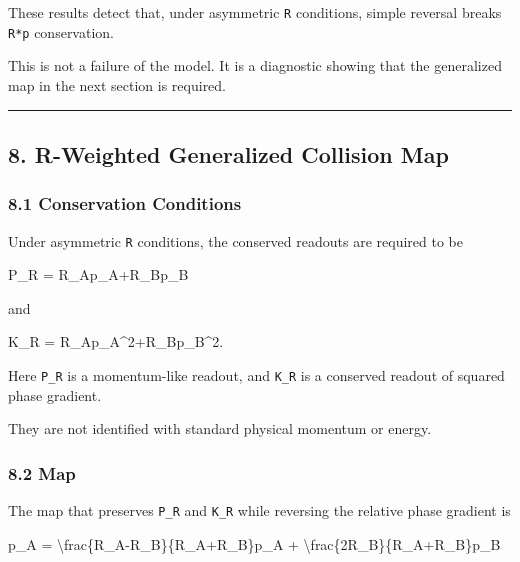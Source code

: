 \documentclass[
  a4paper,
]{article}
\newenvironment{Shaded}{}{}
\newcommand{\NormalTok}[1]{#1}
\begin{document}
These results detect that, under asymmetric \texttt{R} conditions,
simple reversal breaks \texttt{R*p} conservation.

This is not a failure of the model. It is a diagnostic showing that the
generalized map in the next section is required.

\begin{center}\rule{0.5\linewidth}{0.5pt}\end{center}

\subsection{8. R-Weighted Generalized Collision
Map}\label{r-weighted-generalized-collision-map}

\subsubsection{8.1 Conservation
Conditions}\label{conservation-conditions}

Under asymmetric \texttt{R} conditions, the conserved readouts are
required to be

\begin{Shaded}
\begin{Highlighting}[]
\NormalTok{P\_R}
\NormalTok{=}
\NormalTok{R\_Ap\_A+R\_Bp\_B}
\end{Highlighting}
\end{Shaded}

and

\begin{Shaded}
\begin{Highlighting}[]
\NormalTok{K\_R}
\NormalTok{=}
\NormalTok{R\_Ap\_A\^{}2+R\_Bp\_B\^{}2.}
\end{Highlighting}
\end{Shaded}

Here \texttt{P\_R} is a momentum-like readout, and \texttt{K\_R} is a
conserved readout of squared phase gradient.

They are not identified with standard physical momentum or energy.

\subsubsection{8.2 Map}\label{map}

The map that preserves \texttt{P\_R} and \texttt{K\_R} while reversing
the relative phase gradient is

\begin{Shaded}
\begin{Highlighting}[]
\NormalTok{p\_A\textquotesingle{}}
\NormalTok{=}
\NormalTok{\textbackslash{}frac\{R\_A{-}R\_B\}\{R\_A+R\_B\}p\_A}
\NormalTok{+}
\NormalTok{\textbackslash{}frac\{2R\_B\}\{R\_A+R\_B\}p\_B}
\end{Highlighting}
\end{Shaded}
\end{document}
